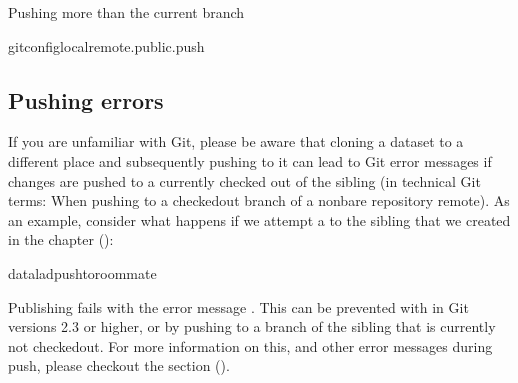 \begin{findoutmore}[label={fom-push-branch}, before title={\thetcbcounter\ }, float, check odd page=true]{Pushing more than the current branch}
\begin{sphinxVerbatim}[commandchars=\\\{\}]
gitconfig\PYGZhy{}\PYGZhy{}localremote.public.push
\end{sphinxVerbatim}


\end{findoutmore}


\subsection{Pushing errors}
\label{\detokenize{basics/101-141-push:pushing-errors}}
\sphinxAtStartPar
If you are unfamiliar with Git, please be aware that cloning a dataset to a different place and subsequently pushing to it can lead to Git error messages if changes are pushed to a currently checked out {\hyperref[\detokenize{glossary:term-branch}]{}} of the sibling (in technical Git terms: When pushing to a checked\sphinxhyphen{}out branch of a non\sphinxhyphen{}bare repository remote).
As an example, consider what happens if we attempt a  to the sibling  that we created in the chapter {\hyperref[\detokenize{basics/basics-collaboration:chapter-collaboration}]{}} ():

\begin{sphinxVerbatim}[commandchars=\\\{\}]
dataladpush\PYGZhy{}\PYGZhy{}toroommate
\end{sphinxVerbatim}

\sphinxAtStartPar
Publishing fails with the error message .
This can be prevented with   in Git versions 2.3 or higher, or by pushing to a branch of the sibling that is currently not checked\sphinxhyphen{}out.
For more information on this, and other error messages during push, please checkout the section {\hyperref[\detokenize{basics/101-135-help:help}]{}} ().

